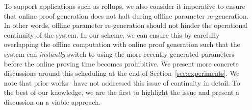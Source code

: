  To support applications such as rollups, we also consider it imperative to ensure that online proof generation does not halt during offline parameter re-generation. In other words, offline parameter re-generation should not hinder the operational continuity of the system. In our scheme, we can ensure this by carefully overlapping the offline computation with online proof generation such that the system can \textit{instantly} switch to using the more recently generated parameters before the online proving time becomes prohibitive. We present more concrete discussions around this scheduling at the end of Section~\ref{sec:experiments}. We note that prior works~\cite{USENIX:OWWB20,CCS:CFHKKO22} have not addressed this issue of continuity in detail. To the best of our knowledge, we are the first to highlight the issue and present a discussion on a viable approach.

%








